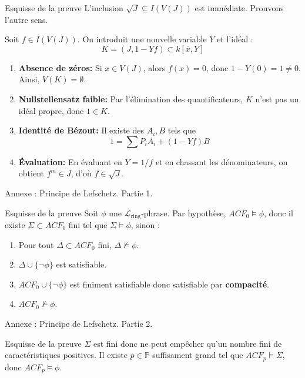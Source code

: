 \documentclass{beamer}
\begin{document}
\begin{frame}{Esquisse de la preuve}
    L'inclusion $\sqrt{J} \subseteq I(V(J))$ est immédiate. Prouvons l'autre sens.
    
    \vspace{0.3cm}
    Soit $f \in I(V(J))$. On introduit une nouvelle variable $Y$ et l'idéal :
    \[ K = (J, 1 - Yf) \subset k[\overline{x}, Y] \]
 
    \begin{enumerate}
        \item \textbf{Absence de zéros:} Si $x \in V(J)$, alors $f(x) = 0$, donc $1 - Y(0) = 1 \neq 0$. Ainsi, $V(K) = \emptyset$.

        \item \textbf{Nullstellensatz faible:} Par l'élimination des quantificateurs, $K$ n'est pas un idéal propre, donc $1 \in K$.
        
        \pause
        \item \textbf{Identité de Bézout:} Il existe des $A_i, B$ tels que 
        \[ 1 = \sum P_i A_i + (1-Yf)B \]
        \item \textbf{Évaluation:} En évaluant en $Y = 1/f$ et en chassant les dénominateurs, on obtient $f^m \in J$, d'où $f \in \sqrt{J}$.
    \end{enumerate}
\end{frame}

\begin{frame}{Annexe : Principe de Lefschetz. Partie 1.}
\begin{exampleblock}{Esquisse de la preuve}
Soit $\phi$ une $\mathcal{L}_{\text{ring}}$-phrase. Par hypothèse, $ACF_0 \models \phi$, donc il existe $\Sigma \subset ACF_0$ fini tel que $\Sigma \models \phi$,
sinon :
\pause
\begin{enumerate}
\item Pour tout $\Delta \subset ACF_0$ fini, $\Delta \not\models \phi$.
\pause
\item $\Delta \cup \{ \neg\phi \}$ est satisfiable.
\pause
\item $ACF_0 \cup \{ \neg\phi \}$ est finiment satisfiable donc satisfiable par \textbf{compacité}.
\pause
\item $ACF_0 \not\models \phi$.
\end{enumerate}
\end{exampleblock}
\end{frame}

\begin{frame}{Annexe : Principe de Lefschetz. Partie 2.}
\begin{exampleblock}{Esquisse de la preuve}
$\Sigma$ est fini donc ne peut empêcher qu'un nombre fini de caractéristiques positives. Il existe $p \in \mathbb{P}$ suffisament grand
tel que $ACF_p \models \Sigma$, donc $ACF_p \models \phi$.
\end{exampleblock}
\end{frame}
\end{document}
